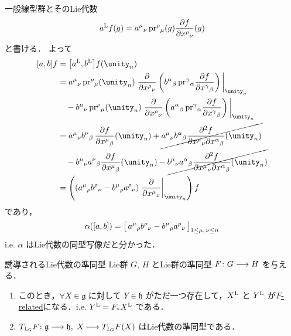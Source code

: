 \documentclass[geometry_main]{subfiles}
\begin{document}
\begin{myexample}[label=ex:gl]{一般線型群とそのLie代数}
    \begin{align}
        a^{\mathrm{L}} f(g) = a^\mu{}_\nu\, \mathrm{pr}^\rho{}_\mu(g) \pdv{f}{x^\rho{}_\nu}()(g)
    \end{align}
    と書ける．
    よって
    \begin{align}
        \comm{a}{b} f
        &= \comm{\Lie{a}}{\Lie{b}} f (\unity_n)\\
        &= a^\mu{}_\nu\, \mathrm{pr}^\rho{}_\mu(\unity_n) \eval{\pdv{}{x^\rho{}_\nu}\left(b^\alpha{}_\beta\, \mathrm{pr}^\gamma{}_\alpha \pdv{f}{x^\gamma{}_\beta} \right)}_{\unity_n} \\
        &\quad - b^\mu{}_\nu\, \mathrm{pr}^\rho{}_\mu(\unity_n) \eval{\pdv{}{x^\rho{}_\nu}\left(a^\alpha{}_\beta\, \mathrm{pr}^\gamma{}_\alpha \pdv{f}{x^\gamma{}_\beta} \right)}_{\unity_n}\\
        &= a^\mu{}_\nu b^\nu{}_\beta\, \pdv{f}{x^\mu{}_\beta}()(\unity_n) + \cancel{a^\mu{}_\nu b^\alpha{}_\beta \pdv[2]{f}{x^\mu{}_\nu}{x^\alpha{}_\beta}()(\unity_n)} \\
        &\quad - b^\mu{}_\nu a^\nu{}_\beta \pdv{f}{x^\mu{}_\beta}()(\unity_n) - \cancel{b^\mu{}_\nu a^\alpha{}_\beta \pdv[2]{f}{x^\mu{}_\nu}{x^\alpha{}_\beta}()(\unity_n)} \\
        &= \left( (a^\mu{}_\rho b^\rho{}_\nu - b^\mu{}_\rho a^\rho{}_\nu) \eval{\pdv{}{x^\mu{}_\nu}}_{\unity_n}\right) f
    \end{align}
    であり，
    \begin{align}
        \alpha (\comm{a}{b}) = \bigl[\, a^\mu{}_\rho b^\rho{}_\nu - b^\mu{}_\rho a^\rho{}_\nu \,\bigr]_{1\le \mu,\, \nu \le n}
    \end{align}
    i.e. $\alpha$ はLie代数の同型写像だと分かった．
\end{myexample}


\begin{mytheo}[label=thm:induced-LieAlg-hom]{誘導されるLie代数の準同型}
    Lie群 $G,\, H$ とLie群の準同型 $F \colon G \longrightarrow H$ を与える．
    \begin{enumerate}
        \item このとき，$\forall X \in \mathfrak{g}$ に対して $Y \in \mathfrak{h}$ がただ一つ存在して，$X^{\mathrm{L}}$ と $Y^{\mathrm{L}}$ が\hyperref[def:F-related]{$F$-related}になる．i.e. $Y^{\mathrm{L}} = F_* X^{\mathrm{L}}$ である．
        \item $T_{1_G} F \colon \mathfrak{g} \longrightarrow \mathfrak{h},\; X \longmapsto T_{1_G}F(X)$ はLie代数の準同型である．
    \end{enumerate}
\end{mytheo}
\end{document}
